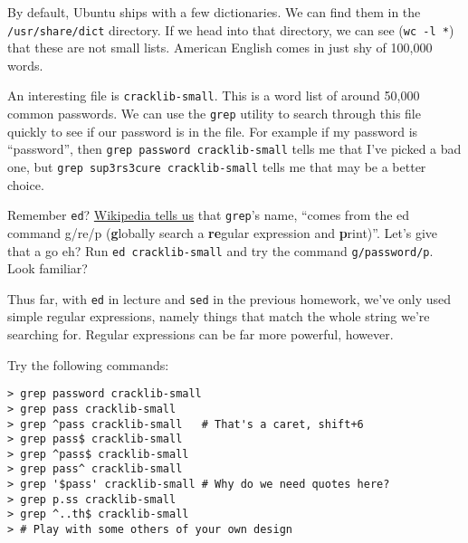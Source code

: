 \documentclass{article}
\begin{document}
\begin{minipage}{0.6\textwidth}
By default, Ubuntu ships with a few dictionaries. We can find them in the
\texttt{/usr/share/dict} directory. If we head into that directory, we can see
(\texttt{wc~-l~*}) that these are not small lists. American English comes in
just shy of 100,000 words.

\medskip
\noindent
An interesting file is \texttt{cracklib-small}. This is a word list of around
50,000 common passwords. We can use the \texttt{grep} utility to search
through this file quickly to see if our password is in the file. For example
if my password is ``password'', then \texttt{grep~password~cracklib-small} tells
me that I've picked a bad one, but \texttt{grep~sup3rs3cure~cracklib-small}
tells me that may be a better choice.

\medskip
\noindent
Remember \texttt{ed}? \href{https://en.wikipedia.org/wiki/Grep}{Wikipedia
tells us} that \texttt{grep}'s name, ``comes from the ed command g/re/p
({\bf g}lobally search a {\bf re}gular expression and {\bf p}rint)''. Let's
give that a go eh?  Run \texttt{ed~cracklib-small} and try the command
\texttt{g/password/p}. Look familiar?

\medskip
\noindent
Thus far, with \texttt{ed} in lecture and \texttt{sed} in the previous
homework, we've only used simple regular expressions, namely things that match
the whole string we're searching for. Regular expressions can be far more
powerful, however.

\medskip
\noindent
Try the following commands:
\begin{lstlisting}
> grep password cracklib-small
> grep pass cracklib-small
> grep ^pass cracklib-small   # That's a caret, shift+6
> grep pass$ cracklib-small
> grep ^pass$ cracklib-small
> grep pass^ cracklib-small
> grep '$pass' cracklib-small # Why do we need quotes here?
> grep p.ss cracklib-small
> grep ^..th$ cracklib-small
> # Play with some others of your own design
\end{lstlisting}


\end{minipage}
\begin{minipage}{0.05\textwidth}
  ~~~~
\end{minipage}
\end{document}
